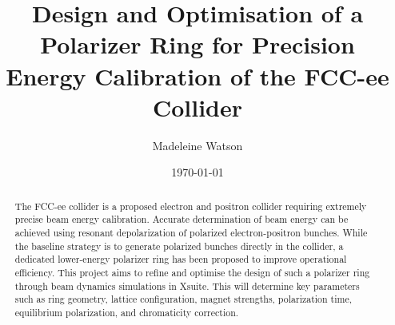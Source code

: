 \documentclass[aip,twocolumn,10pt,graphicx]{revtex4-1}
\begin{document}

\title{Design and Optimisation of a Polarizer Ring for Precision Energy Calibration of the FCC-ee Collider} %



\author{Madeleine Watson}


\date{\today}

\begin{abstract}
The FCC-ee collider is a proposed electron and positron collider requiring extremely precise beam energy calibration. Accurate determination of beam energy can be achieved using resonant depolarization of polarized electron-positron bunches. While the baseline strategy is to generate polarized bunches directly in the collider, a dedicated lower-energy polarizer ring has been proposed to improve operational efficiency. This project aims to refine and optimise the design of such a polarizer ring through beam dynamics simulations in Xsuite. This will determine key parameters such as ring geometry, lattice configuration, magnet strengths, polarization time, equilibrium polarization, and chromaticity correction.
\end{abstract}

\pacs{}%

\maketitle %
\end{document}
